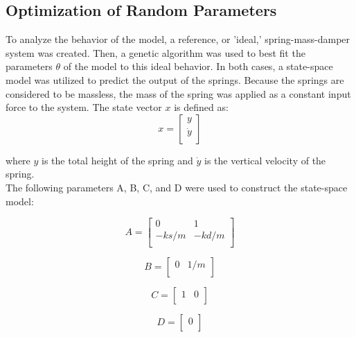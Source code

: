 \documentclass[conference]{article}
\begin{document}
\subsection{Optimization of Random Parameters}
To analyze the behavior of the model, a reference, or 'ideal,' spring-mass-damper system was created. Then, a genetic algorithm was used to best fit the parameters $\theta$ of the model to this ideal behavior. In both cases, a state-space model was utilized to predict the output of the springs. Because the springs are considered to be massless, the mass of the spring was applied as a constant input force to the system. The state vector $x$ is defined as: 
\begin{equation}
x = \begin{bmatrix}
y\\ \dot{y}\\
\end{bmatrix}
\end{equation}

where $y$ is the total height of the spring and $\dot{y}$ is the vertical velocity of the spring.\\

\noindent The following parameters A, B, C, and D were used to construct the state-space model:

\begin{equation}
A = \begin{bmatrix}
0 & 1 \\ -ks/m & -kd/m\\
\end{bmatrix}
\end{equation}

\begin{equation}
B = \begin{bmatrix}
0 & 1/m\\
\end{bmatrix}
\end{equation}

\begin{equation}
C = \begin{bmatrix}
1& 0\\
\end{bmatrix}
\end{equation}

\begin{equation}
D = \begin{bmatrix}
 0\\
\end{bmatrix}
\end{equation}
\end{document}
